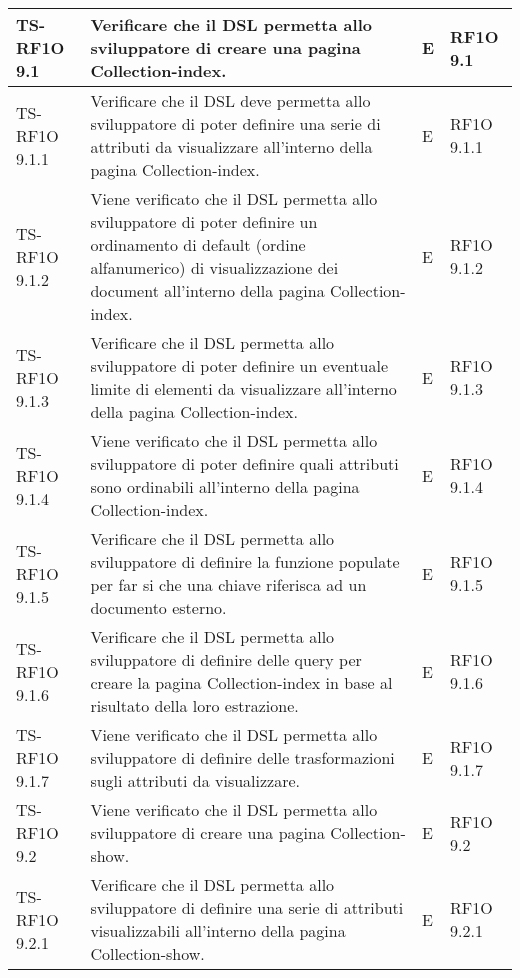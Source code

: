 \begin{center}
\begin{longtable}{| p{3cm} | p{6cm} | p{1.5cm} | p{2cm} | }
				TS-RF1O 9.1 & 
				Verificare che il DSL permetta allo sviluppatore di creare una pagina Collection-index. & E & RF1O 9.1 \newline  \\ \hline 
				TS-RF1O 9.1.1 & 
				Verificare che il DSL deve permetta allo sviluppatore di poter definire una serie di attributi da visualizzare all’interno della pagina Collection-index. & E & RF1O 9.1.1 \newline  \\ \hline 
				TS-RF1O 9.1.2 & 
				Viene verificato che il DSL permetta allo sviluppatore di poter definire un ordinamento di default (ordine alfanumerico) di visualizzazione dei document all'interno della pagina Collection-index. & E & RF1O 9.1.2 \newline  \\ \hline 
				TS-RF1O 9.1.3 & 
				Verificare che il DSL permetta allo sviluppatore di poter definire un eventuale limite di elementi da visualizzare all’interno della pagina Collection-index. & E & RF1O 9.1.3 \newline  \\ \hline 
				TS-RF1O 9.1.4 & 
				Viene verificato che il DSL permetta allo sviluppatore di poter definire quali attributi sono ordinabili all’interno della pagina Collection-index. & E & RF1O 9.1.4 \newline  \\ \hline 
				TS-RF1O 9.1.5 & 
				Verificare che il DSL permetta allo sviluppatore di definire la funzione populate per far si che una chiave riferisca ad un documento esterno. & E & RF1O 9.1.5 \newline  \\ \hline 
				TS-RF1O 9.1.6 & 
				Verificare che il DSL permetta allo sviluppatore di definire delle query per creare la pagina Collection-index in base al risultato della loro estrazione. & E & RF1O 9.1.6 \newline  \\ \hline 
				TS-RF1O 9.1.7 & 
				Viene verificato che il DSL permetta allo sviluppatore di definire delle trasformazioni sugli attributi da visualizzare. & E & RF1O 9.1.7 \newline  \\ \hline 
				TS-RF1O 9.2 & 
				Viene verificato che il DSL permetta allo sviluppatore di creare una pagina Collection-show. & E & RF1O 9.2 \newline  \\ \hline 
				TS-RF1O 9.2.1 & 
				Verificare che il DSL permetta allo sviluppatore di definire una serie di attributi visualizzabili all’interno della pagina Collection-show. & E & RF1O 9.2.1 \newline  \\ \hline 

\end{longtable}
\end{center}

